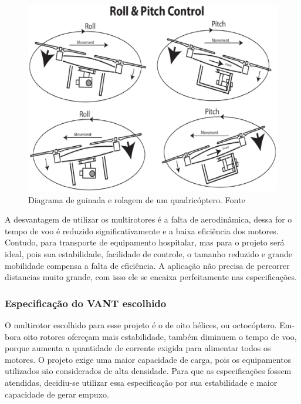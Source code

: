 \begin{figure}[H]
    \centering
      \includegraphics[keepaspectratio=true,scale=0.5]{figuras/guinada.eps}
    \caption[Diagrama de guinada e rolagem de um quadricóptero.]{Diagrama de guinada e rolagem de um quadricóptero. Fonte \cite{audronis}}
    \label{fig:guinada}
\end{figure}

A desvantagem de utilizar  os multirotores  é a  falta  de aerodinâmica,  dessa for o tempo de voo é reduzido significativamente e a baixa  eficiência dos motores.  Contudo, para transporte de equipamento hospitalar, mas para o projeto será ideal, pois sua estabilidade, facilidade de controle, o tamanho reduzido e grande mobilidade compensa a falta de eficiência. A aplicação não precisa de percorrer distancias muito grande, com isso ele se encaixa perfeitamente nas especificações.

\subsubsection{Especificação do VANT escolhido}

O multirotor escolhido para esse projeto é o de oito hélices, ou octocóptero. Em- bora oito rotores ofereçam mais estabilidade, também diminuem o tempo de voo, porque aumenta a quantidade de corrente exigida para alimentar todos os motores.  O projeto exige uma maior capacidade de carga, pois os equipamentos utilizados são considerados de alta densidade. Para que as especificações fossem atendidas, decidiu-se utilizar essa especificação por sua estabilidade e maior capacidade de gerar empuxo.

